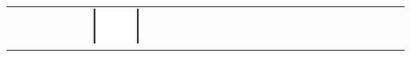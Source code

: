 \documentclass[10pt]{article}
\begin{document}
\begin{center}
\begin{tabular}{|c|c|c|c|c|c|c|c|c|c|c|c|c|c|c|c|c|c|c|c|c|c|c|c|c|c|c|c|c|c|c|}
 &  &  &  &  &  &  & \includegraphics[max width=\textwidth]{2024_11_21_5229b9d0453456f1828dg-15(14)}

\end{tabular}
\end{center}
\end{document}
